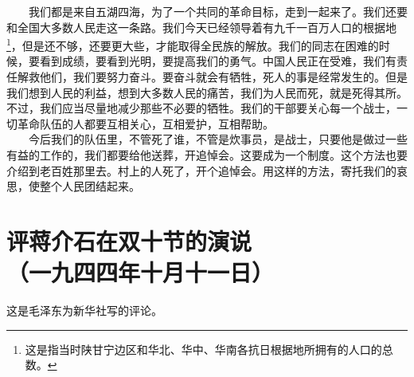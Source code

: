 \documentclass[cn,11pt,chinese]{elegantbook}
\def\myformat#1{\hfil\hfil #1}
\begin{document}
　　我们都是来自五湖四海，为了一个共同的革命目标，走到一起来了。我们还要和全国大多数人民走这一条路。我们今天已经领导着有九千一百万人口的根据地\footnote[4]{ 这是指当时陕甘宁边区和华北、华中、华南各抗日根据地所拥有的人口的总数。}，但是还不够，还要更大些，才能取得全民族的解放。我们的同志在困难的时候，要看到成绩，要看到光明，要提高我们的勇气。中国人民正在受难，我们有责任解救他们，我们要努力奋斗。要奋斗就会有牺牲，死人的事是经常发生的。但是我们想到人民的利益，想到大多数人民的痛苦，我们为人民而死，就是死得其所。不过，我们应当尽量地减少那些不必要的牺牲。我们的干部要关心每一个战士，一切革命队伍的人都要互相关心，互相爱护，互相帮助。\\
　　今后我们的队伍里，不管死了谁，不管是炊事员，是战士，只要他是做过一些有益的工作的，我们都要给他送葬，开追悼会。这要成为一个制度。这个方法也要介绍到老百姓那里去。村上的人死了，开个追悼会。用这样的方法，寄托我们的哀思，使整个人民团结起来。\\
\newpage\section*{\myformat{评蒋介石在双十节的演说}\\\myformat{（一九四四年十月十一日）}}
\begin{introduction}\item  这是毛泽东为新华社写的评论。\end{introduction}
\end{document}
